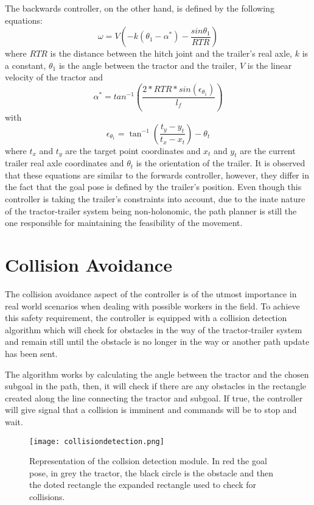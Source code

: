 The backwards controller, on the other hand, is defined by the following equations:
\begin{equation}
    \omega = V \left(-k (\theta_1 - \alpha^*) - \frac{sin\theta_1}{RTR}\right)
\end{equation}
where $RTR$ is the distance between the hitch joint and the trailer's real axle, 
$k$ is a constant, $\theta_1$ is the angle between the tractor and the trailer, 
$V$ is the linear velocity of the tractor and 
\begin{equation}
    \alpha^* = tan^{-1}\left(\frac{2*RTR*sin(\epsilon_{\theta_1})}{l_f}\right)
\end{equation}
with
\begin{equation}
    \epsilon_{\theta_1} = \tan^{-1}\left(\frac{t_y - y_t}{t_x - x_t}\right) - \theta_t
\end{equation}
where $t_x$ and $t_y$ are the target point coordinates and $x_t$ and $y_t$ are the current trailer real axle coordinates and 
$\theta_t$ is the orientation of the trailer. It is observed that 
these equations are similar to the forwards controller, however, they differ 
in the fact that the goal pose is defined by the trailer's position. Even though 
this controller is taking the trailer's constraints into account, due to 
the inate nature of the tractor-trailer system being non-holonomic, the 
path planner is still the one responsible for maintaining the feasibility 
of the movement.


\section{Collision Avoidance}
\label{sec:collision}
The collision avoidance aspect of the controller is of the utmost importance 
in real world scenarios when dealing with possible workers in the field. To achieve 
this safety requirement, the controller is equipped with a collision detection algorithm 
which will check for obstacles in the way of the tractor-trailer system and remain still until the 
obstacle is no longer in the way or another path update has been sent.

The algorithm works by calculating the angle between the tractor and the chosen 
subgoal in the path, then, it will check if there are any obstacles in the rectangle 
created along the line connecting the tractor and subgoal. If true, the controller will 
give signal that a collision is imminent and commands will be to stop and wait.

\begin{figure}[h]
    \centering
    \texttt{[image: collisiondetection.png]}
    \caption{Representation of the collsion detection module. In red the goal pose, in grey the tractor, the black circle is the obstacle and then the doted rectangle the expanded rectangle used to check for collisions.}
    \label{fig:collisiondetection}
\end{figure}
